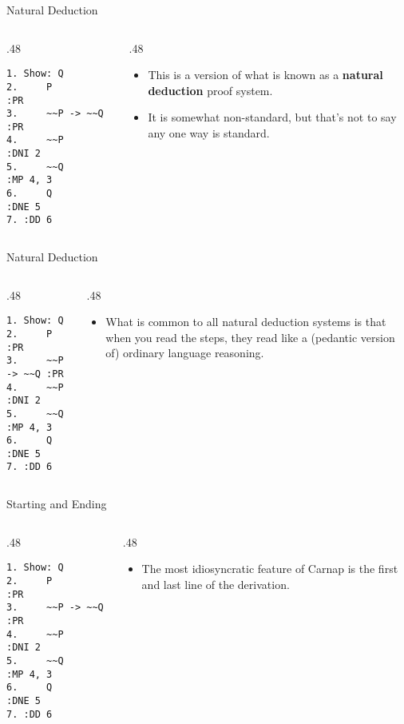 \documentclass[
  ignorenonframetext,
]{beamer}
\providecommand{\tightlist}{%
  \setlength{\itemsep}{0pt}\setlength{\parskip}{0pt}}
\renewcommand{\,}{\text{, }}
\def\begincols{\begin{columns}}
\def\begincol{\begin{column}}
\def\endcol{\end{column}}
\def\endcols{\end{columns}}
\begin{document}
\begin{frame}[fragile]{Natural Deduction}
\protect\hypertarget{natural-deduction}{}

\begincols
\begincol{.48\textwidth}

\begin{verbatim}
1. Show: Q
2.     P          :PR
3.     ~~P -> ~~Q :PR
4.     ~~P        :DNI 2
5.     ~~Q        :MP 4, 3
6.     Q          :DNE 5
7. :DD 6
\end{verbatim}

\endcol
\begincol{.48\textwidth}

\begin{itemize}
\tightlist
\item
  This is a version of what is known as a \textbf{natural deduction}
  proof system.
\item
  It is somewhat non-standard, but that's not to say any one way is
  standard.
\end{itemize}

\endcol
\endcols

\end{frame}

\begin{frame}[fragile]{Natural Deduction}
\protect\hypertarget{natural-deduction-1}{}

\begincols
\begincol{.48\textwidth}

\begin{verbatim}
1. Show: Q
2.     P          :PR
3.     ~~P -> ~~Q :PR
4.     ~~P        :DNI 2
5.     ~~Q        :MP 4, 3
6.     Q          :DNE 5
7. :DD 6
\end{verbatim}

\endcol
\begincol{.48\textwidth}

\begin{itemize}
\tightlist
\item
  What is common to all natural deduction systems is that when you read
  the steps, they read like a (pedantic version of) ordinary language
  reasoning.
\end{itemize}

\endcol
\endcols

\end{frame}

\begin{frame}[fragile]{Starting and Ending}
\protect\hypertarget{starting-and-ending}{}

\begincols
\begincol{.48\textwidth}

\begin{verbatim}
1. Show: Q
2.     P          :PR
3.     ~~P -> ~~Q :PR
4.     ~~P        :DNI 2
5.     ~~Q        :MP 4, 3
6.     Q          :DNE 5
7. :DD 6
\end{verbatim}

\endcol
\begincol{.48\textwidth}

\begin{itemize}
\tightlist
\item
  The most idiosyncratic feature of Carnap is the first and last line of
  the derivation.
\end{itemize}

\endcol
\endcols

\end{frame}
\end{document}
